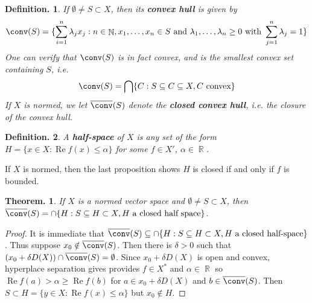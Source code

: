 \documentclass[11pt, a4paper]{memoir}
\DeclareMathOperator{\N}{{\mathbb{N}}}
\DeclareMathOperator{\R}{{\mathbb{R}}}
\theoremstyle{change}
\newtheorem{theorem}{Theorem.}[section]
\theoremstyle{plain}
\theoremstyle{nonumberplain}
\newtheorem{definition}{Definition.}
\newtheorem{proof}{Proof}
\renewcommand{\Re}{\ensuremath{\operatorname{Re}}}
\numberwithin{equation}{section}
\begin{document}
\begin{definition}
    If $\emptyset\neq S\subset X$, then its \textbf{convex hull} is given by
    \begin{equation*}
        \conv(S) = \{\sum_{i=1}^n\lambda_jx_j:n\in\N,x_1,\ldots,x_n\in S\text{ and }\lambda_1,\ldots,\lambda_n\geq 0\text{ with }\sum_{j=1}^n\lambda_j=1\}
    \end{equation*}
    One can verify that $\conv(S)$ is in fact convex, and is the smallest convex set containing $S$, i.e.
    \begin{equation*}
        \conv(S)=\bigcap\{C:S\subseteq C\subseteq X,C\text{ convex}\}
    \end{equation*}
    If $X$ is normed, we let $\overline{\conv}(S)$ denote the \textbf{closed convex hull}, i.e. the closure of the convex hull.
\end{definition}
\begin{definition}
    A \textbf{half-space} of $X$ is any set of the form $H=\{x\in X:\Re f(x)\leq \alpha\}$ for some $f\in X'$, $\alpha\in\R$.
\end{definition}
If $X$ is normed, then the last proposition shows $H$ is closed if and only if $f$ is bounded.
\begin{theorem}
    If $X$ is a normed vector space and $\emptyset\neq S\subset X$, then $\overline{\conv}(S)=\cap\{H:S\subseteq H\subset X, H\text{ a closed half space}\}$.
\end{theorem}
\begin{proof}
    It is immediate that $\overline{\conv}(S)\subseteq\cap\{H:S\subseteq H\subset X,H\text{ a closed half-space}\}$.
    Thus suppose $x_0\notin \overline{\conv}(S)$.
    Then there is $\delta>0$ such that $(x_0+\delta D(X))\cap\overline{\conv}(S)=\emptyset$.
    Since $x_0+\delta D(X)$ is open and convex, hyperplace separation gives provides $f\in X^*$ and $\alpha\in\R$ so $\Re f(a)>\alpha\geq\Re f(b)$ for $a\in x_0+\delta D(X)$ and $b\in\overline{\conv}(S)$.
    Then $S\subset H=\{y\in X:\Re f(x)\leq\alpha\}$ but $x_0\notin H$.
\end{proof}
\end{document}
